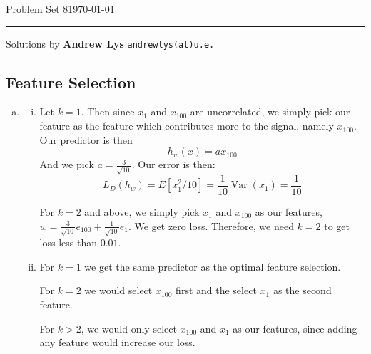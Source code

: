 \documentclass{amsart}
\DeclareMathOperator{\Var}{Var}  %
\theoremstyle{definition}
\begin{document}
\noindent
Problem Set 8\hfill \today  %
\smallskip
\hrule
\smallskip
\noindent
Solutions by {\bf Andrew Lys} \qquad   %
  {\tt andrewlys(at)u.e.}      %

\vspace{0.5cm}
\subsection{Feature Selection}
\begin{enumerate}[(a)]
  \item 
    \begin{enumerate}[i.]
      \item 
        Let $k = 1$. Then since $x_1$ and $x_{100}$ are uncorrelated, we simply pick our feature as the feature which contributes more to the signal, namely $x_100$. 
        Our predictor is then 
        \[h_w(x) = a x_{100}\]
        And we pick $a = \frac{3}{\sqrt{10}}$.
        Our error is then:
        \[L_D(h_w) = E[x_1^2/10] = \frac{1}{10}\Var(x_1) = \frac{1}{10}\]

        For $k = 2$ and above, we simply pick $x_1$ and $x_{100}$ as our features, $w = \frac{3}{\sqrt{10}} e_{100} + \frac{1}{\sqrt{10}} e_1$. 
        We get zero loss. Therefore, we need $k=2$ to get loss less than $0.01$.
      \item
        For $k=1$ we get the same predictor as the optimal feature selection. 

        For $k=2$ we would select $x_{100}$ first and the select $x_1$ as the second feature. 

        For $k>2$, we would only select $x_{100}$ and $x_1$ as our features, since adding any feature would increase our loss.
        

\end{enumerate}
\end{enumerate}
\end{document}
